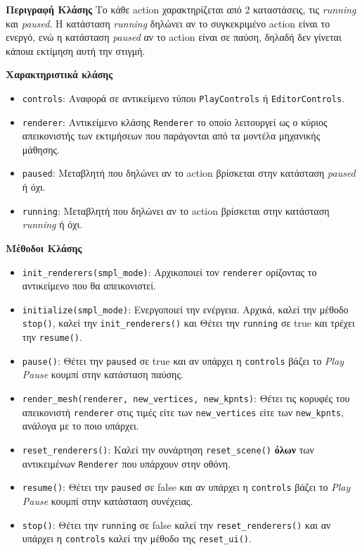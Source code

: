 \noindent\textbf{Περιγραφή Κλάσης}
Το κάθε action χαρακτηρίζεται από 2 καταστάσεις, τις \textsl{running} και \textsl{paused}. Η κατάσταση \textsl{running} δηλώνει αν το συγκεκριμένο action είναι το ενεργό, ενώ η κατάσταση \textsl{paused} αν το action είναι σε παύση, δηλαδή δεν γίνεται κάποια εκτίμηση αυτή την στιγμή.

\noindent\textbf{Χαρακτηριστικά κλάσης}
\begin{itemize}
	\item \texttt{controls}: Αναφορά σε αντικείμενο τύπου \texttt{PlayControls} ή \texttt{EditorControls}.
	\item \texttt{renderer}: Αντικείμενο κλάσης \texttt{Renderer} το οποίο λειτουργεί ως ο κύριος απεικονιστής των εκτιμήσεων που παράγονται από τα μοντέλα μηχανικής μάθησης.
	\item \texttt{paused}: Μεταβλητή που δηλώνει αν το action βρίσκεται στην κατάσταση \textsl{paused} ή όχι.
	\item \texttt{running}: Μεταβλητή που δηλώνει αν το action βρίσκεται στην κατάσταση \textsl{running} ή όχι.
\end{itemize}

\noindent\textbf{Μέθοδοι Κλάσης}
\begin{itemize}
	\item \texttt{init\_renderers(smpl\_mode)}: Αρχικοποιεί τον \texttt{renderer} ορίζοντας το αντικείμενο που θα απεικονιστεί.
	\item \texttt{initialize(smpl\_mode)}: Ενεργοποιεί την ενέργεια. Αρχικά, καλεί την μέθοδο \texttt{stop()}, καλεί την \texttt{init\_renderers()} και Θέτει την \texttt{running} σε true και τρέχει την \texttt{resume()}.
	\item \texttt{pause()}: Θέτει την \texttt{paused} σε true και αν υπάρχει η \texttt{controls} βάζει το \textit{Play\\Pause} κουμπί στην κατάσταση παύσης.
	\item \texttt{render\_mesh(renderer, new\_vertices, new\_kpnts)}: Θέτει τις κορυφές του απεικονιστή \texttt{renderer} στις τιμές είτε των \texttt{new\_vertices} είτε των \texttt{new\_kpnts}, ανάλογα με το ποιο υπάρχει.
	\item \texttt{reset\_renderers()}: Καλεί την συνάρτηση \texttt{reset\_scene()} \textbf{όλων} των αντικειμένων \texttt{Renderer} που υπάρχουν στην οθόνη.
	\item \texttt{resume()}: Θέτει την \texttt{paused} σε false και αν υπάρχει η \texttt{controls} βάζει το \textit{Play\\Pause} κουμπί στην κατάσταση συνέχειας. 
	\item \texttt{stop()}: Θέτει την \texttt{running} σε false καλεί την \texttt{reset\_renderers()} και αν υπάρχει η \texttt{controls} καλεί την μέθοδο της \texttt{reset\_ui()}.
\end{itemize}

